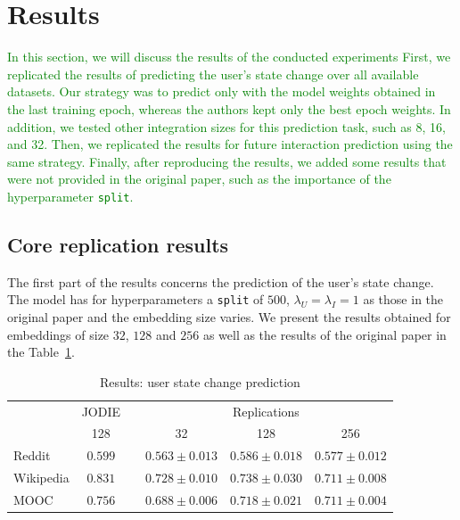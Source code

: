 \section{Results}
\textcolor{green}{In this section, we will discuss the results of the conducted experiments}
\textcolor{green}{First, we replicated the results of predicting the user's state change over all available datasets. Our strategy was to predict only with the model weights obtained in the last training epoch, whereas the authors kept only the best epoch weights. In addition, we tested other integration sizes for this prediction task, such as 8, 16, and 32. Then, we replicated the results for future interaction prediction using the same strategy. Finally, after reproducing the results, we added some results that were not provided in the original paper, such as the importance of the hyperparameter \texttt{split}.}

\subsection{Core replication results}
The first part of the results concerns the prediction of the user's state change. The model has for hyperparameters a \texttt{split} of $500$, $\lambda_U = \lambda_I = 1$ as those in the original paper and the embedding size varies. We present the results obtained for embeddings of size $32$, $128$ and $256$ as well as the results of the original paper in the Table~\ref{result-state}.

\begin{table}[htbp]
    \centering
    \begin{tabular}{@{}lcrrrr@{}}
    \toprule
    & JODIE & \phantom{abc} & \multicolumn{3}{c}{Replications} \\
    \cmidrule{2-2} \cmidrule{4-6}
    & 128 && \multicolumn{1}{c}{32} & \multicolumn{1}{c}{128} & \multicolumn{1}{c}{256} \\
    \midrule
    Reddit & $\boldsymbol{0.599}$ && $0.563 \pm 0.013$ & $0.586 \pm 0.018$ & $0.577 \pm 0.012$\\
    Wikipedia &$\boldsymbol{0.831}$ && $0.728 \pm 0.010$ & $0.738 \pm 0.030$ & $0.711 \pm 0.008$\\
    MOOC &$\boldsymbol{0.756}$ && $0.688 \pm 0.006$ & $0.718 \pm 0.021$ & $0.711 \pm 0.004$\\
    \bottomrule
    \end{tabular}
    \caption{Results: user state change prediction}
    \label{result-state}
\end{table}

